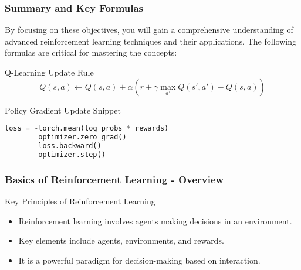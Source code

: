 \documentclass[aspectratio=169]{beamer}
\begin{document}
\begin{frame}[fragile]
    \frametitle{Summary and Key Formulas}
    By focusing on these objectives, you will gain a comprehensive understanding of advanced reinforcement learning techniques and their applications. The following formulas are critical for mastering the concepts:

    \begin{block}{Q-Learning Update Rule}
        \begin{equation}
            Q(s,a) \leftarrow Q(s,a) + \alpha \left( r + \gamma \max_{a'} Q(s',a') - Q(s,a) \right)
        \end{equation}
    \end{block}

    \begin{block}{Policy Gradient Update Snippet}
        \begin{lstlisting}[language=Python]
        loss = -torch.mean(log_probs * rewards)
        optimizer.zero_grad()
        loss.backward()
        optimizer.step()
        \end{lstlisting}
    \end{block}
\end{frame}

\begin{frame}[fragile]
    \frametitle{Basics of Reinforcement Learning - Overview}
    \begin{block}{Key Principles of Reinforcement Learning}
        \begin{itemize}
            \item Reinforcement learning involves agents making decisions in an environment.
            \item Key elements include agents, environments, and rewards.
            \item It is a powerful paradigm for decision-making based on interaction.
        \end{itemize}
    \end{block}
\end{frame}
\end{document}
